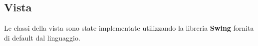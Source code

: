 \subsection{Vista}
Le classi della vista sono state implementate utilizzando la libreria
\textbf{Swing} fornita di default dal linguaggio.
